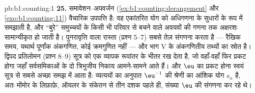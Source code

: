 \begin{solution}{pb:b1:counting:1}
\textbf{25.} समावेशन--अपवर्जन (\cref{ex:b1:counting:derangement} और
\cref{exo:b1:counting:11}) वैचारिक उपपत्ति है: वह एकांतरित योग को अधिगणना के
सुधारों के रूप में समझाती है, और ``बुरे'' समुच्चयों के किसी भी परिवार से
बचने वाले अवयवों की गणना तक अक्षरशः सामान्यीकृत हो जाती है। पुनरावृत्ति वाला
रास्ता (प्रश्न 5--7) सबसे तेज़ संगणना करता है --- रैखिक समय, यथार्थ पूर्णांक
अंकगणित, कोई क्रमगुणित नहीं --- और भाग V के अंकगणितीय तथ्यों का स्रोत है।
द्विपद प्रतिलोमन (प्रश्न 8--9) सूत्र को एक व्यापक रूपांतर के भीतर रख देता
है, जो वहाँ-वहाँ फिर प्रकट होगा जहाँ सर्वसमिकाओं के दो त्रिभुजीय निकाय
आमने-सामने आते हैं। और $\eu$ का प्रकट होना स्वयं सूत्र से सबसे अच्छा समझ में
आता है: व्यत्ययों का अनुपात $\eu^{-1}$ की श्रेणी का आंशिक योग $s_n$ है, अतः
मोंमोर के लिफ़ाफ़े, ऑयलर के संकेतन से तीन दशक पहले ही, संख्या $\eu$ की
संगणना कर रहे थे।
\end{solution}
